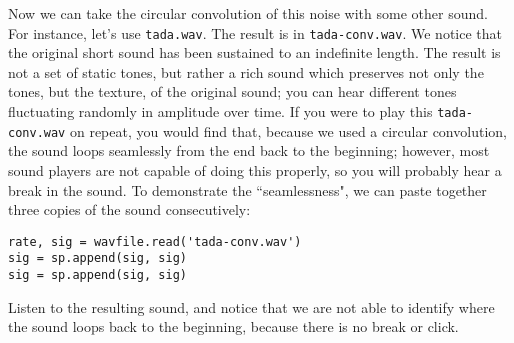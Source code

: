 Now we can take the circular convolution of this noise with some other sound.
For instance, let's use \texttt{tada.wav}.
The result is in \texttt{tada-conv.wav}.
We notice that the original short sound has been sustained to an indefinite length.
The result is not a set of static tones, but rather a rich sound which preserves not only the tones, but the texture, of the original sound; you can hear different tones fluctuating randomly in amplitude over time.
If you were to play this \texttt{tada-conv.wav} on repeat, you would find that, because we used a circular convolution, the sound loops seamlessly from the end back to the beginning; however, most sound players are not capable of doing this properly, so you will probably hear a break in the sound. To demonstrate the ``seamlessness", we can paste together three copies of the sound consecutively:

\begin{lstlisting}
rate, sig = wavfile.read('tada-conv.wav')
sig = sp.append(sig, sig)
sig = sp.append(sig, sig)
\end{lstlisting}

Listen to the resulting sound, and notice that we are not able to identify where the sound loops back to the beginning, because there is no break or click.

\begin{comment}
\begin{problem}
Record yourself singing a few notes (or, feel free to produce some other sound another way).
Take the circular convolution of white noise with this recording.
Now do it again using stereo white noise.
This is just like the mono white noise problem, but make the SciPy array in two dimensions.
It's no problem that your original recording will probably be mono; just make the left and right channels duplicate in the recording (but: be sure to use different left and right channels for the white noise).
Can you hear any difference between the mono and stereo versions of the result?
\end{problem}

Feel free to play around with this. The file \texttt{guitar-conv.mp3} is a collage of sounds created using this technique (mostly using guitar samples). You could probably think of other lots of other things you can do with this.
\end{comment}

